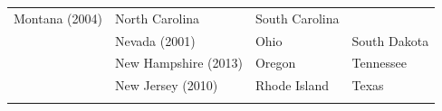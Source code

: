 \documentclass[11pt,]{article}
\begin{document}
\begin{longtable}[]{@{}llll@{}}
\begin{minipage}[t]{0.26\columnwidth}
Montana (2004)\strut
\end{minipage} & \begin{minipage}[t]{0.24\columnwidth}\raggedright
North Carolina\strut
\end{minipage} & \begin{minipage}[t]{0.19\columnwidth}\raggedright
South Carolina\strut
\end{minipage}\tabularnewline
\begin{minipage}[t]{0.20\columnwidth}\raggedright
\strut
\end{minipage} & \begin{minipage}[t]{0.26\columnwidth}\raggedright
Nevada (2001)\strut
\end{minipage} & \begin{minipage}[t]{0.24\columnwidth}\raggedright
Ohio\strut
\end{minipage} & \begin{minipage}[t]{0.19\columnwidth}\raggedright
South Dakota\strut
\end{minipage}\tabularnewline
\begin{minipage}[t]{0.20\columnwidth}\raggedright
\strut
\end{minipage} & \begin{minipage}[t]{0.26\columnwidth}\raggedright
New Hampshire (2013)\strut
\end{minipage} & \begin{minipage}[t]{0.24\columnwidth}\raggedright
Oregon\strut
\end{minipage} & \begin{minipage}[t]{0.19\columnwidth}\raggedright
Tennessee\strut
\end{minipage}\tabularnewline
\begin{minipage}[t]{0.20\columnwidth}\raggedright
\strut
\end{minipage} & \begin{minipage}[t]{0.26\columnwidth}\raggedright
New Jersey (2010)\strut
\end{minipage} & \begin{minipage}[t]{0.24\columnwidth}\raggedright
Rhode Island\strut
\end{minipage} & \begin{minipage}[t]{0.19\columnwidth}\raggedright
Texas\strut
\end{minipage}\tabularnewline
\begin{minipage}[t]{0.20\columnwidth}\raggedright
\strut
\end{minipage} & \begin{minipage}[t]{0.26\columnwidth}\raggedright

\end{minipage}
\end{longtable}
\end{document}
